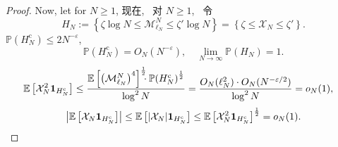 \begin{proof}
{        Now, let for $N\ge 1$,
    }{
        现在,~ 对 $N\ge 1$,~ 令
    }
    \begin{equation*}
        H_N
        :=\left\{
            \zeta\log N\le \mathcal M^N_{\ell_N}\le \zeta'\log N
        \right\}
        =
        \left\{
            \zeta\le \mathcal X_N\le \zeta'
        \right\}.
    \end{equation*}
    $
        \mathbb P(
            H_N^{\mathrm c}
        )
        \le
        2N^{-\varepsilon}
    $,
    \begin{equation*}
        \mathbb P(
            H_N^{\mathrm c}
        )
        =
        O_N(N^{-\varepsilon}),
        \quad
        \lim_{N\to\infty}\mathbb P(H_N)=1.
    \end{equation*}
    \begin{align*}
        \mathbb E\left[
            \mathcal X_N^2
            {\bf 1}_{H_N^{\mathrm c}}
        \right]
        &
        \le
        \frac{
            \mathbb E\left[
                \left(
                    \mathcal M^N_{\ell_N}
                \right)^4
            \right]^{\frac 12}
            \!\!\!
            \cdot
            \mathbb P\!\left(
                H_N^{\mathrm c}
            \right)^{\frac 12}
        }{\log^2 N}
        =
        \frac{
            O_N(\ell_N^2)
            \cdot
            O_N(N^{-\varepsilon/2})
        }{\log^2 N}
        =
        o_N(1),
    \end{align*}
    \begin{equation*}
        \left|
            \mathbb E\left[
                \mathcal X_N
                {\bf 1}_{H_N^{\mathrm c}}
            \right]
        \right|
        \le
        \mathbb E\left[
            |\mathcal X_N|
            {\bf 1}_{H_N^{\mathrm c}}
        \right]
        \le
        \mathbb E\left[
            \mathcal X_N^2
            {\bf 1}_{H_N^{\mathrm c}}
        \right]^{\frac 12}
        =
        o_N(1).
    \end{equation*}
\end{proof}
